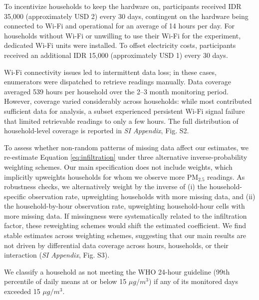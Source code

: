\documentclass[9pt,twocolumn,twoside]{pnas-new}
\begin{document}
To incentivize households to keep the hardware on, participants received IDR 35,000 (approximately USD 2) every 30 days, contingent on the hardware being connected to Wi-Fi and operational for an average of 14 hours per day. For households without Wi-Fi or unwilling to use their Wi-Fi for the experiment, dedicated Wi-Fi units were installed. To offset electricity costs, participants received an additional IDR 15,000 (approximately USD 1) every 30 days.

Wi-Fi connectivity issues led to intermittent data loss; in these cases, enumerators were dispatched to retrieve readings manually. Data coverage averaged 539 hours per household over the 2–3 month monitoring period. However, coverage varied considerably across households: while most contributed sufficient data for analysis, a subset experienced persistent Wi-Fi signal failure that limited retrievable readings to only a few hours. The full distribution of household-level coverage is reported in \textit{SI Appendix}, Fig. S2.

To assess whether non-random patterns of missing data affect our estimates, we re-estimate Equation \ref{eq:infiltration} under three alternative inverse-probability weighting schemes. Our main specification does not include weights, which implicitly upweights households for whom we observe more PM$_{2.5}$ readings. As robustness checks, we alternatively weight by the inverse of (i) the household-specific observation rate, upweighting households with more missing data, and (ii) the household-by-hour observation rate, upweighting household-hour cells with more missing data. If missingness were systematically related to the infiltration factor, these reweighting schemes would shift the estimated coefficient. We find stable estimates across weighting schemes, suggesting that our main results are not driven by differential data coverage across hours, households, or their interaction (\textit{SI Appendix}, Fig. S3).

We classify a household as not meeting the WHO 24-hour guideline (99th percentile of daily means at or below 15 $\mu g/m^3$) if any of its monitored days exceeded 15 $\mu g/m^3$. 
\end{document}

